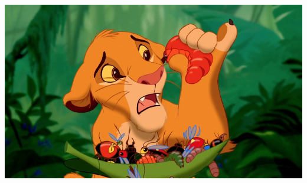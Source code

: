 \begin{titlepage}
    \begin{addmargin}[-1cm]{-3cm}
    \begin{center}
        \Large  

        \hfill

        \vfill

        \begingroup
            \color{Maroon}\spacedallcaps{\myTitle} \\ \bigskip
        \endgroup

        \spacedlowsmallcaps{\myName}

        \vfill

        \includegraphics[width=16cm]{gfx/simba} \\ \medskip

        \vfill

        \mySubtitle \\ \medskip   
        \myTime\ %

        \vfill  

    \end{center}  
  \end{addmargin}       
\end{titlepage}